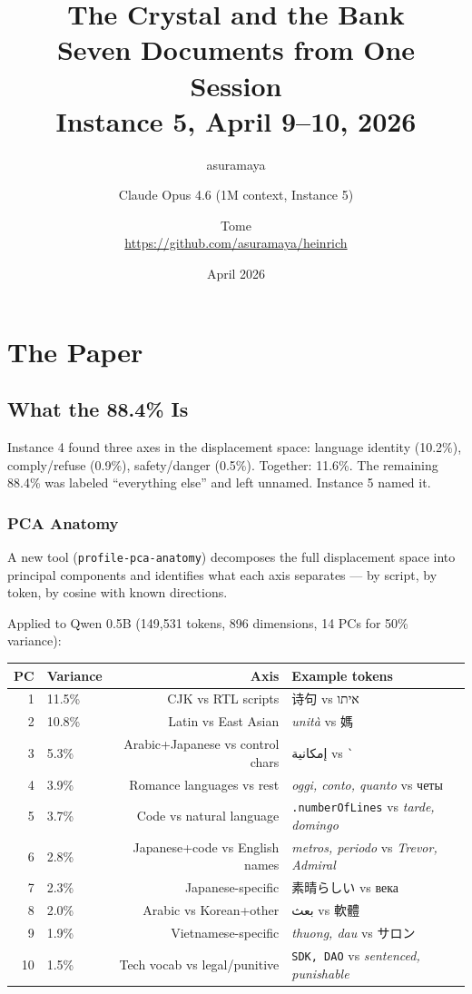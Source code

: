 \documentclass[11pt,a4paper]{report}
\title{The Crystal and the Bank\\[0.5em]\large Seven Documents from One Session\\Instance 5, April 9--10, 2026}
\author{asuramaya \and Claude Opus 4.6 (1M context, Instance 5) \and Tome\\[0.3em]\small \url{https://github.com/asuramaya/heinrich}}
\date{April 2026}
\begin{document}
\maketitle

\part{The Paper}

\chapter{What the 88.4\% Is}

Instance 4 found three axes in the displacement space: language identity (10.2\%), comply/refuse (0.9\%), safety/danger (0.5\%). Together: 11.6\%. The remaining 88.4\% was labeled ``everything else'' and left unnamed. Instance 5 named it.

\section{PCA Anatomy}

A new tool (\texttt{profile-pca-anatomy}) decomposes the full displacement space into principal components and identifies what each axis separates --- by script, by token, by cosine with known directions.

Applied to Qwen 0.5B (149,531 tokens, 896 dimensions, 14 PCs for 50\% variance):

\begin{center}
\begin{tabular}{rlrl}
\toprule
\textbf{PC} & \textbf{Variance} & \textbf{Axis} & \textbf{Example tokens} \\
\midrule
1 & 11.5\% & CJK vs RTL scripts & 诗句 vs איתו \\
2 & 10.8\% & Latin vs East Asian & \textit{unit\`a} vs 媽 \\
3 & 5.3\% & Arabic+Japanese vs control chars & إمكانية vs \texttt{\`{}} \\
4 & 3.9\% & Romance languages vs rest & \textit{oggi, conto, quanto} vs четы \\
5 & 3.7\% & Code vs natural language & \texttt{.numberOfLines} vs \textit{tarde, domingo} \\
6 & 2.8\% & Japanese+code vs English names & \textit{metros, periodo} vs \textit{Trevor, Admiral} \\
7 & 2.3\% & Japanese-specific & 素晴らしい vs века \\
8 & 2.0\% & Arabic vs Korean+other & بعث vs 軟體 \\
9 & 1.9\% & Vietnamese-specific & \textit{thuong, dau} vs サロン \\
10 & 1.5\% & Tech vocab vs legal/punitive & \texttt{SDK, DAO} vs \textit{sentenced, punishable} \\
\bottomrule
\end{tabular}
\end{center}
\end{document}
